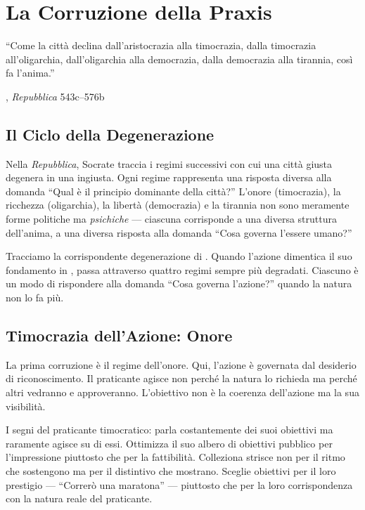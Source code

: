 \chapter{La Corruzione della Praxis}

\epigraph{``Come la citt\`a declina dall'aristocrazia alla timocrazia, dalla
timocrazia all'oligarchia, dall'oligarchia alla democrazia, dalla democrazia
alla tirannia, cos\`i fa l'anima.''}{\textcite{plato1997complete}, \emph{Repubblica} 543c--576b}

\section{Il Ciclo della Degenerazione}

Nella \emph{Repubblica}, Socrate traccia i regimi successivi con cui
una citt\`a giusta degenera in una ingiusta. Ogni regime rappresenta
una risposta diversa alla domanda ``Qual \`e il principio dominante
della citt\`a?'' L'onore (timocrazia), la ricchezza (oligarchia), la
libert\`a (democrazia) e la tirannia non sono meramente forme politiche
ma \emph{psichiche} --- ciascuna corrisponde a una diversa struttura
dell'anima, a una diversa risposta alla domanda ``Cosa governa l'essere
umano?''

Tracciamo la corrispondente degenerazione di \praxis. Quando l'azione
dimentica il suo fondamento in \physis, passa attraverso quattro regimi
sempre pi\`u degradati. Ciascuno \`e un modo di rispondere alla domanda
``Cosa governa l'azione?'' quando la natura non lo fa pi\`u.

\section{Timocrazia dell'Azione: Onore}

La prima corruzione \`e il regime dell'onore. Qui, l'azione \`e
governata dal desiderio di riconoscimento. Il praticante agisce non
perch\'e la natura lo richieda ma perch\'e altri vedranno e
approveranno. L'obiettivo non \`e la coerenza dell'azione ma la sua
visibilit\`a.

I segni del praticante timocratico: parla costantemente dei suoi
obiettivi ma raramente agisce su di essi. Ottimizza il suo albero di
obiettivi pubblico per l'impressione piuttosto che per la fattibilit\`a.
Colleziona strisce non per il ritmo che sostengono ma per il distintivo
che mostrano. Sceglie obiettivi per il loro prestigio --- ``Correr\`o
una maratona'' --- piuttosto che per la loro corrispondenza con la
natura reale del praticante.


